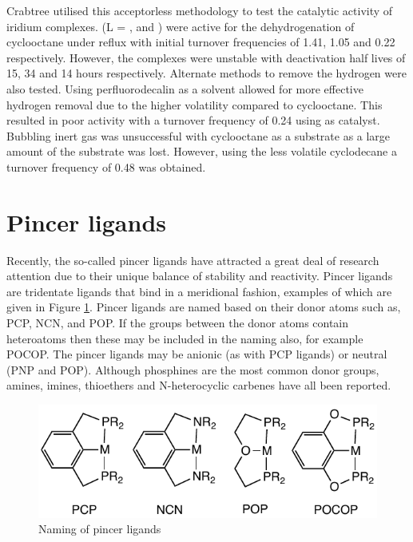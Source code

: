 Crabtree utilised this acceptorless methodology to test the catalytic activity of iridium complexes.\cite{Aoki1993}   (L = ,  and ) were active for the dehydrogenation of cyclooctane under reflux with initial turnover frequencies of 1.41, 1.05 and 0.22  respectively.  However, the complexes were unstable with deactivation half lives of 15, 34 and 14 hours respectively.\cite{Aoki1993}  Alternate methods to remove the hydrogen were also tested.  Using perfluorodecalin as a solvent allowed for more effective hydrogen removal due to the higher volatility compared to cyclooctane.  This resulted in poor activity with a turnover frequency of 0.24  using  as catalyst.  Bubbling inert gas was unsuccessful with cyclooctane as a substrate as a large amount of the substrate was lost.  However, using the less volatile cyclodecane a turnover frequency of 0.48   was obtained.\cite{Aoki1993}


\section{Pincer ligands}

Recently, the so-called pincer ligands have attracted a great deal of research attention due to their unique balance of stability and reactivity.\cite{Becerra2009}  Pincer ligands are tridentate ligands that bind in a meridional fashion, examples of which are given in Figure \ref{Pincernaming}.  Pincer ligands are named based on their donor atoms such as, PCP, NCN, and POP.  If the groups between the donor atoms contain heteroatoms then these may be included in the naming also, for example POCOP.  The pincer ligands may be anionic (as with PCP ligands) or neutral (PNP and POP).\cite{Vlugt2009, Kataoka1995}  Although phosphines are the most common donor groups, amines,\cite{Singleton2003} imines,\cite{Takenaka2005} thioethers\cite{Zim2000} and N-heterocyclic carbenes\cite{Hahn2007} have all been reported.

\begin{figure}[ht]
\centering
\includegraphics[]{../Figures/Pincernaming.pdf}
\caption[Naming of pincer ligands]{Naming of pincer ligands}
\label{Pincernaming}
\end{figure}

